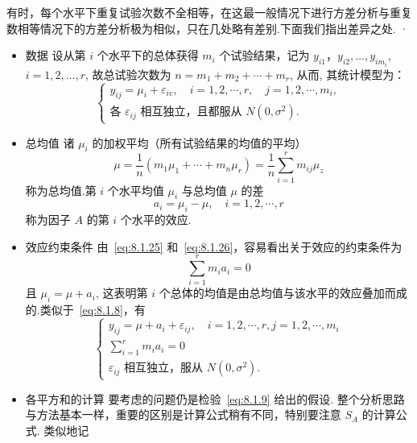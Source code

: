 有时，每个水平下重复试验次数不全相等，在这最一般情况下进行方差分析与重复数相等情况下的方差分析极为相似，只在几处略有差别.下面我们指出差异之处.
·
\begin{itemize}
  \item 数据
  设从第 $i$ 个水平下的总体获得 $m_i$ 个试验结果，记为 $y_{i1}，y_{i2},\ldots,y_{im_{i}}$, $i=1,2,\ldots,r$, 故总试验次数为 $n=m_1+m_2+\cdots+m_r$, 从而, 其统计模型为：
  \begin{equation}\label{eq:8.1.24}
    \begin{cases}
      y_{i j}=\mu_{i}+\varepsilon_{i v}, \quad i=1,2, \cdots, r, \quad j=1,2, \cdots, m_{i},\\
      \text{各 $\varepsilon_{ij}$ 相互独立，且都服从 $N(0,\sigma^2)$}.
    \end{cases}
  \end{equation}
  \item 总均值
  诸 $\mu_i$ 的加权平均（所有试验结果的均值的平均）
  \begin{equation}\label{eq:8.1.25}
    \mu=\frac{1}{n}\left(m_{1} \mu_{1}+\cdots+m_{n} \mu_{r}\right)=\frac{1}{n} \sum_{i=1}^{r} m_{i j} \mu_{z}
  \end{equation}
  称为总均值.第 $i$ 个水平均值 $\mu_i$ 与总均值 $\mu$ 的差
  \begin{equation}\label{eq:8.1.26}
    a_{i}=\mu_{i}-\mu, \quad i=1,2, \cdots, r
  \end{equation}
  称为因子 $A$ 的第 $i$ 个水平的效应.
  \item 效应约束条件
  由~\eqref{eq:8.1.25} 和~\eqref{eq:8.1.26}，容易看出关于效应的约束条件为
  \begin{equation*}
    \sum_{i=1}^{r} m_{i} a_{i}=0
  \end{equation*}
  且 $\mu_i = \mu + a_i$, 这表明第 $i$ 个总体的均值是由总均值与该水平的效应叠加而成的.类似于~\eqref{eq:8.1.8}，有
  \begin{equation}\label{eq:8.1.27}
    \begin{cases}
      y_{i j}=\mu+a_{i}+\varepsilon_{i j}, \quad i=1,2, \cdots, r, j=1,2, \cdots, m_{i}\\
      \sum_{i=1}^{r} m_{i} a_{i}=0\\
      \text{$\varepsilon_{ij}$ 相互独立，服从 $N(0,\sigma^2)$}.
    \end{cases}
  \end{equation}
  \item 各平方和的计算
  要考虑的问题仍是检验~\eqref{eq:8.1.9} 给出的假设. 整个分析思路与方法基本一样，重要的区别是计算公式稍有不同，特别要注意 $S_A$ 的计算公式. 类似地记

\end{itemize}
